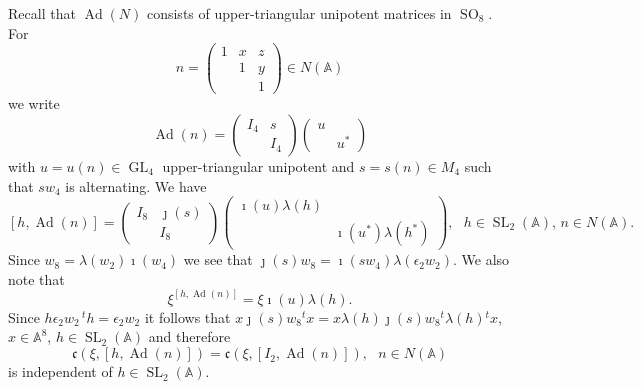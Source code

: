 \documentclass[12pt]{amsart}
\newcommand{\GL}{\operatorname{GL}}
\newcommand{\SL}{\operatorname{SL}}
\newcommand{\SO}{\operatorname{SO}}
\newcommand{\Ad}{\operatorname{Ad}}
\newcommand{\A}{\mathbb{A}}
\renewcommand{\c}{\mathfrak{c}}
\theoremstyle{remark}
\begin{document}
Recall that $\Ad(N)$ consists of upper-triangular unipotent matrices in $\SO_8$.
For
\begin{equation}\label{eq n coord}
n=\begin{pmatrix} 1 & x & z \\  & 1 & y \\ & & 1 \end{pmatrix}\in N(\A)
\end{equation}
we write
\[
\Ad(n)=\begin{pmatrix} I_4 & s \\ & I_4 \end{pmatrix}\begin{pmatrix} u &  \\ & u^* \end{pmatrix}
\]
with $u=u(n)\in \GL_4$ upper-triangular unipotent and $s=s(n)\in M_4$ such that $sw_4$ is alternating.
We have
\[
[h,\Ad(n)]=\begin{pmatrix} I_8 & \jmath(s) \\ & I_8 \end{pmatrix}\begin{pmatrix} \imath(u) \lambda(h) &  \\ & \imath(u^*)\lambda(h^*) \end{pmatrix}, \ \ \ h\in \SL_2(\A),\,
n\in N(\A).
\]
Since $w_8=\lambda(w_2)\imath(w_4)$ we see that $\jmath(s)w_8=\imath(sw_4)\lambda(\epsilon_2w_2)$.
We also note that
\[
\xi^{[h,\Ad(n)]}=\xi \imath(u)\lambda(h).
\]
Since $h\epsilon_2w_2 \,{}^t h=\epsilon_2w_2 $ it follows that $x\jmath(s)w_8{}^t x=x\lambda(h)\jmath(s)w_8{}^t \lambda(h){}^t x$, $x\in \A^8$, $h\in \SL_2(\A)$ and therefore
\begin{equation}\label{eq hind}
\c(\xi,[h,\Ad(n)])=\c(\xi,[I_2,\Ad(n)]), \ \ \ n\in N(\A)
\end{equation}
is independent of $h\in \SL_2(\A)$. 
\end{document}
